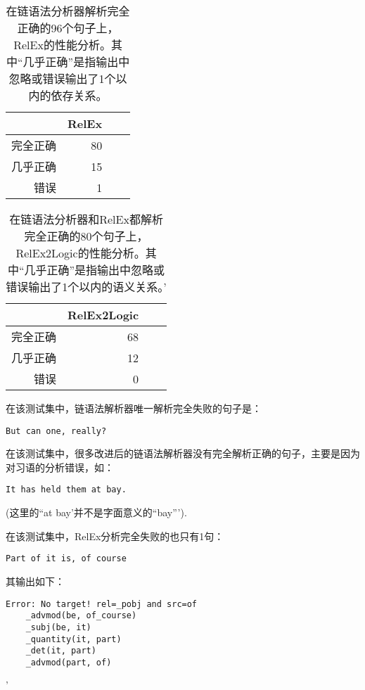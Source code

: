 \begin{table}
\center
\begin{tabular}{|r|r|r||c|}
\hline
 & RelEx\\
\hline
完全正确 & 80    \\
几乎正确 & 15     \\
错误 & 1     \\

\hline
\end{tabular}
\caption{在链语法分析器解析完全正确的96个句子上，RelEx的性能分析。其中“几乎正确”是指输出中忽略或错误输出了1个以内的依存关系。}
\label{table:relexResult}
\end{table}

\begin{table}
\center
\begin{tabular}{|r|r|r||c|}
\hline
 & RelEx2Logic\\
\hline
完全正确 & 68    \\
几乎正确 & 12     \\
错误 & 0     \\

\hline
\end{tabular}
\caption{在链语法分析器和RelEx都解析完全正确的80个句子上，RelEx2Logic的性能分析。其中“几乎正确”是指输出中忽略或错误输出了1个以内的语义关系。'}
\label{table:rel2logResult}
\end{table}

\FloatBarrier


在该测试集中，链语法解析器唯一解析完全失败的句子是：

\begin{verbatim}
But can one, really?
\end{verbatim}

\noindent 在该测试集中，很多改进后的链语法解析器没有完全解析正确的句子，主要是因为对习语的分析错误，如：

 \begin{verbatim}
It has held them at bay.
 \end{verbatim}

\noindent (这里的``at bay'并不是字面意义的“bay”').


在该测试集中，RelEx分析完全失败的也只有1句：

 \begin{verbatim}
Part of it is, of course
 \end{verbatim}
 
 \noindent 其输出如下：

 \begin{verbatim}
Error: No target! rel=_pobj and src=of
    _advmod(be, of_course)
    _subj(be, it)
    _quantity(it, part)
    _det(it, part)
    _advmod(part, of)
 \end{verbatim}'
 
